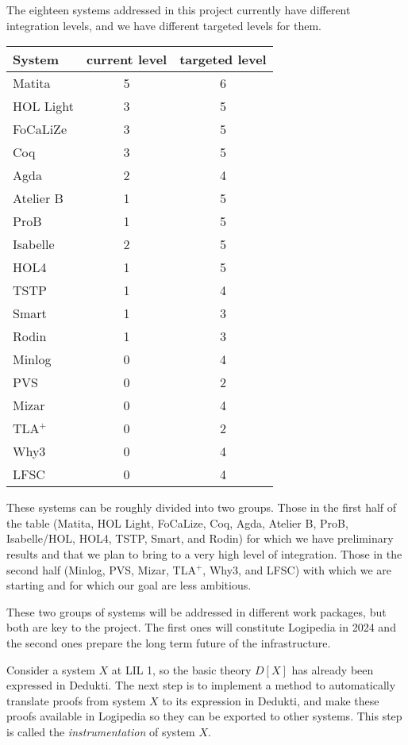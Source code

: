 The eighteen systems addressed in this project currently have different
integration levels, and we have different targeted levels for them.

\begin{center}
\begin{tabular}{|l|c|c|}
\hline
System & current level & targeted level\\
\hline
Matita & 5 & 6\\
\hline
HOL Light & 3 & 5\\
\hline
FoCaLiZe & 3 & 5\\
\hline
Coq & 3 & 5\\
\hline
Agda & 2 & 4\\
\hline
Atelier B & 1 & 5\\
\hline
ProB & 1 & 5\\
\hline
Isabelle & 2 & 5\\
\hline
HOL4 & 1 & 5\\
\hline
TSTP & 1 & 4\\
\hline
Smart & 1 & 3\\
\hline
Rodin & 1 & 3\\
\hline
Minlog & 0 & 4\\
\hline
PVS & 0 & 2\\
\hline
Mizar & 0 & 4\\
\hline
TLA$^+$ & 0 & 2\\
\hline
Why3 & 0 & 4\\
\hline
LFSC & 0 & 4\\
\hline
\end{tabular}
\end{center}

These systems can be roughly divided into two groups. Those in the
first half of the table (Matita, HOL Light, FoCaLize, Coq, Agda,
Atelier B, ProB, Isabelle/HOL, HOL4, TSTP, Smart, and Rodin) for which
we have preliminary results and that we plan to bring to a very high
level of integration. Those in the second half (Minlog, PVS, 
Mizar, TLA$^+$, Why3, and LFSC) with which we are
starting and for which our goal are less ambitious.

These two groups of systems will be addressed in different work
packages, but both are key to the project. The first ones will
constitute Logipedia in 2024 and the second ones prepare the long term
future of the infrastructure.

  
Consider a system $X$ at LIL 1, so the basic theory $D[X]$ has already
been expressed in Dedukti. The next step is to implement a method to
automatically translate proofs from system $X$ to its expression in
Dedukti, and make these proofs available in Logipedia so they can be
exported to other systems. This step is called the
\emph{instrumentation} of system $X$.

